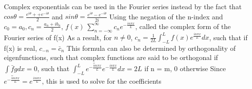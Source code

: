 \documentclass[11 pt, twoside]{article}
\newenvironment{outline*}
{
	\begin{outline}[enumerate]
	}
	{\end{outline}
}
\begin{document}
\begin{outline*}
\1 Complex exponentials can be used in the Fourier series instead by the fact that $cos\theta = \frac{e^{i\theta} + +e^{-i\theta}}{2}$ and $sin\theta = \frac{e^{i\theta} - e^{-i\theta}}{2i}$
	\2 Using the negation of the n-index and $c_0 = a_0, c_n = \frac{a_n + ib_n}{2}$, $f(x) ~ \sum_{n = -\infty}^{\infty} c_n e^{-\frac{in\pi x}{L}}$, called the complex form of the Fourier series of f(x)
	\2 As a result, for $n \neq 0$, $c_n = \frac{1}{2L} \int^L_{-L} f(x)e^{\frac{in\pi x}{L}}dx$, such that if f(x) is real, $c_{-n} = \bar{c}_n$
		\3 This formula can also be determined by orthogonality of eigenfunctions, such that complex functions are said to be orthogonal if $\int \bar{f}gdx = 0$, such that $\int^L_{-L} \bar{e^{-\frac{im\pi x}{L}}} e^{-\frac{in\pi x}{L}}dx = 2L$ if n = m, 0 otherwise
		\3 Since $\bar{e^{-\frac{im\pi x}{L}}} = e^{\frac{im\pi x}{L}}$, this is used to solve for the coefficients
\end{outline*}
\end{document}
